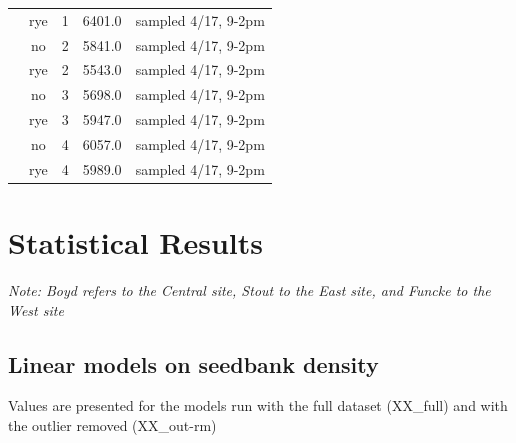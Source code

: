 \documentclass[]{article}
\begin{document}
\begin{table}[H]
\begin{tabular}[t]{ccccc}
\rowcolor{gray!6}   & rye & 1 & 6401.0 & sampled 4/17, 9-2pm\\

 & no & 2 & 5841.0 & sampled 4/17, 9-2pm\\

\rowcolor{gray!6}   & rye & 2 & 5543.0 & sampled 4/17, 9-2pm\\

 & no & 3 & 5698.0 & sampled 4/17, 9-2pm\\

\rowcolor{gray!6}   & rye & 3 & 5947.0 & sampled 4/17, 9-2pm\\

 & no & 4 & 6057.0 & sampled 4/17, 9-2pm\\

\rowcolor{gray!6}  \multirow[t]{-8}{*}{\centering\arraybackslash West} & rye & 4 & 5989.0 & sampled 4/17, 9-2pm\\
\bottomrule
\end{tabular}
\end{table}

\newpage

\hypertarget{statistical-results}{%
\section{Statistical Results}\label{statistical-results}}

\emph{Note: Boyd refers to the Central site, Stout to the East site, and
Funcke to the West site}

\hypertarget{linear-models-on-seedbank-density}{%
\subsection{Linear models on seedbank
density}\label{linear-models-on-seedbank-density}}

Values are presented for the models run with the full dataset (XX\_full)
and with the outlier removed (XX\_out-rm)
\end{document}
